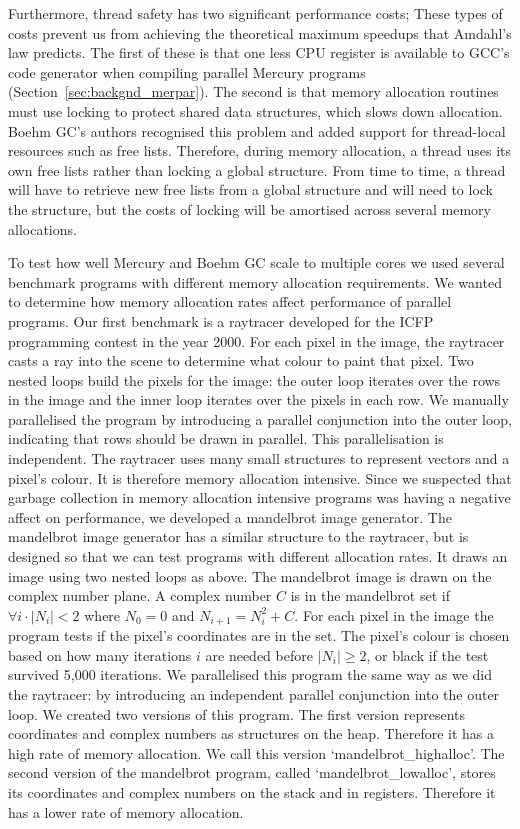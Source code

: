 Furthermore, thread safety has two significant performance costs;
These types of costs prevent us from achieving the theoretical maximum
speedups that Amdahl's law predicts.
The first of these is that
one less CPU register is available to GCC's code generator when compiling
parallel Mercury programs (Section~\ref{sec:backgnd_merpar}).
The second is that
memory allocation routines must use locking to protect shared data
structures,
which slows down allocation.
Boehm GC's authors recognised this problem and
added support for thread-local resources such as free lists.
Therefore,
during memory allocation,
a thread uses its own free lists rather than locking a global structure.
From time to time, a thread will have to retrieve new free lists
from a global structure and will need to lock the structure,
but the costs of locking will be amortised across several memory allocations.

To test how well Mercury and Boehm GC scale to multiple cores we used several
benchmark programs with different memory allocation requirements.
We wanted to determine how memory allocation rates affect
performance of parallel programs.
Our first benchmark is a raytracer developed for the
ICFP programming contest in the year 2000.
For each pixel in the image,
the raytracer casts a ray into the scene to determine what colour to paint that pixel.
Two nested loops build the pixels for the image:
the outer loop iterates over the rows in the image and
the inner loop iterates over the pixels in each row.
We manually parallelised the program by introducing a parallel
conjunction into the outer loop,
indicating that rows should be drawn in parallel.
This parallelisation is independent.
The raytracer uses many small structures to represent vectors and a pixel's
colour.
It is therefore memory allocation intensive.
Since we suspected that garbage collection in memory allocation intensive
programs was having a negative affect on performance,
we developed a mandelbrot image generator.
The mandelbrot image generator has a similar structure to the raytracer,
but is designed so that we can test programs with different allocation rates.
It draws an image using two nested loops as above.
The mandelbrot image is drawn on the complex number plane.
A complex number $C$ is in the mandelbrot set if
$\forall i \cdot |N_i| < 2$ where $N_0 = 0$ and $N_{i+1} = N_{i}^2 + C$.
For each pixel in the image the program tests if the pixel's coordinates are
in the set.
The pixel's colour is chosen based on how many iterations $i$ are needed
before $|N_i| \ge 2$,
or black if the test survived 5,000 iterations.
We parallelised this program the same way as we did the raytracer:
by introducing an independent parallel conjunction into the outer loop.
We created two versions of this program.
The first version represents coordinates and complex numbers as structures
on the heap.
Therefore it has a high rate of memory allocation.
We call this version `mandelbrot\_highalloc'.
The second version of the mandelbrot program,
called `mandelbrot\_lowalloc',
stores its coordinates and complex numbers on the stack and in registers.
Therefore it has a lower rate of memory allocation.


